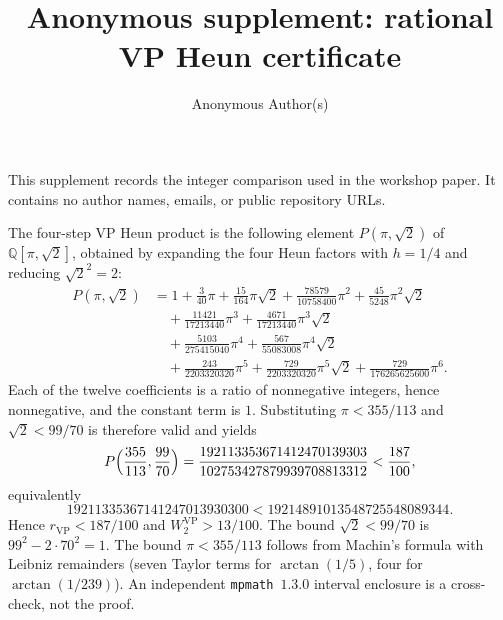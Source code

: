 \documentclass{article}
\title{Anonymous supplement: rational VP Heun certificate}
\author{Anonymous Author(s)}
\begin{document}
\maketitle

This supplement records the integer comparison used in the workshop
paper. It contains no author names, emails, or public repository URLs.

The four-step VP Heun product is the following element $P(\pi,\sqrt{2})$
of $\mathbb{Q}[\pi,\sqrt{2}]$, obtained by expanding the four Heun
factors with $h=1/4$ and reducing $\sqrt{2}^2=2$:
\begin{equation}
\begin{aligned}
P(\pi,\sqrt{2})
&= 1+\frac{3}{40}\pi+\frac{15}{164}\pi\sqrt{2}
+\frac{78579}{10758400}\pi^2+\frac{45}{5248}\pi^2\sqrt{2}\\
&\quad+\frac{11421}{17213440}\pi^3
+\frac{4671}{17213440}\pi^3\sqrt{2}\\
&\quad+\frac{5103}{275415040}\pi^4
+\frac{567}{55083008}\pi^4\sqrt{2}\\
&\quad+\frac{243}{2203320320}\pi^5
+\frac{729}{2203320320}\pi^5\sqrt{2}
+\frac{729}{176265625600}\pi^6.
\end{aligned}
\end{equation}
Each of the twelve coefficients is a ratio of nonnegative integers,
hence nonnegative, and the constant term is $1$. Substituting
$\pi<355/113$ and $\sqrt{2}<99/70$ is therefore valid and yields
\[
P\Bigl(\frac{355}{113},\frac{99}{70}\Bigr)
=\frac{192113353671412470139303}{102753427879939708813312}
<\frac{187}{100},
\]
equivalently
\[
19211335367141247013930300<19214891013548725548089344.
\]
Hence $r_{\mathrm{VP}}<187/100$ and $W_2^{\mathrm{VP}}>13/100$.
The bound $\sqrt{2}<99/70$ is $99^2-2\cdot 70^2=1$. The bound
$\pi<355/113$ follows from Machin's formula with Leibniz remainders
(seven Taylor terms for $\arctan(1/5)$, four for $\arctan(1/239)$).
An independent \texttt{mpmath}~$1.3.0$ interval enclosure is a
cross-check, not the proof.
\end{document}

